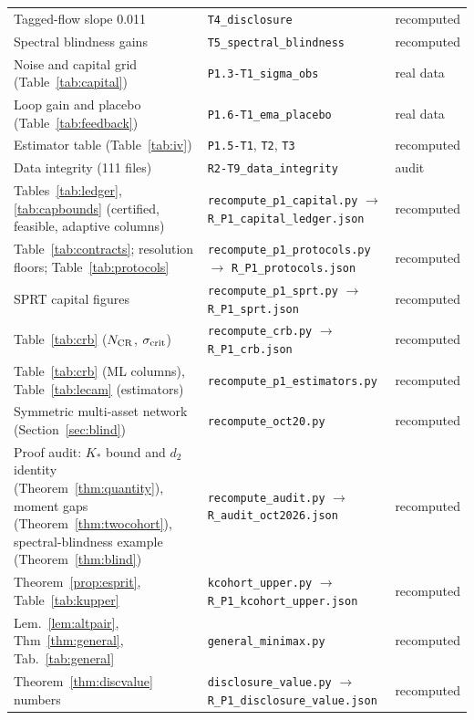 \documentclass[12pt]{article}
\theoremstyle{definition}
\theoremstyle{remark}
\begin{document}
\begin{longtable}{p{}p{}p{}}
Tagged-flow slope 0.011 & \nolinkurl{T4_disclosure} & recomputed\\
Spectral blindness gains & \nolinkurl{T5_spectral_blindness} & recomputed\\
Noise and capital grid (Table~\ref{tab:capital}) & \nolinkurl{P1.3-T1_sigma_obs} & real data\\
Loop gain and placebo (Table~\ref{tab:feedback}) & \nolinkurl{P1.6-T1_ema_placebo} & real data\\
Estimator table (Table~\ref{tab:iv}) & \nolinkurl{P1.5-T1}, \nolinkurl{T2}, \nolinkurl{T3} & recomputed\\
Data integrity (111 files) & \nolinkurl{R2-T9_data_integrity} & audit\\
Tables~\ref{tab:ledger}, \ref{tab:capbounds} (certified, feasible, adaptive columns) & \nolinkurl{recompute_p1_capital.py} $\to$ \nolinkurl{R_P1_capital_ledger.json} & recomputed\\
Table~\ref{tab:contracts}; resolution floors; Table~\ref{tab:protocols} & \nolinkurl{recompute_p1_protocols.py} $\to$ \nolinkurl{R_P1_protocols.json} & recomputed\\
SPRT capital figures & \nolinkurl{recompute_p1_sprt.py} $\to$ \nolinkurl{R_P1_sprt.json} & recomputed\\
Table~\ref{tab:crb} ($N_{\rm CR}$, $\sigma_{\rm crit}$) & \nolinkurl{recompute_crb.py} $\to$ \nolinkurl{R_P1_crb.json} & recomputed\\
Table~\ref{tab:crb} (ML columns), Table~\ref{tab:lecam} (estimators) & \nolinkurl{recompute_p1_estimators.py} & recomputed\\
Symmetric multi-asset network (Section~\ref{sec:blind}) & \nolinkurl{recompute_oct20.py} & recomputed\\
Proof audit: $K_*$ bound and $d_2$ identity (Theorem~\ref{thm:quantity}), moment gaps (Theorem~\ref{thm:twocohort}), spectral-blindness example (Theorem~\ref{thm:blind}) & \nolinkurl{recompute_audit.py} $\to$ \nolinkurl{R_audit_oct2026.json} & recomputed\\
Theorem~\ref{prop:esprit}, Table~\ref{tab:kupper} & \nolinkurl{kcohort_upper.py} $\to$ \nolinkurl{R_P1_kcohort_upper.json} & recomputed\\
Lem.~\ref{lem:altpair}, Thm~\ref{thm:general}, Tab.~\ref{tab:general} & \nolinkurl{general_minimax.py} & recomputed\\
Theorem~\ref{thm:discvalue} numbers & \nolinkurl{disclosure_value.py} $\to$ \nolinkurl{R_P1_disclosure_value.json} & recomputed\\

\end{longtable}
\end{document}
